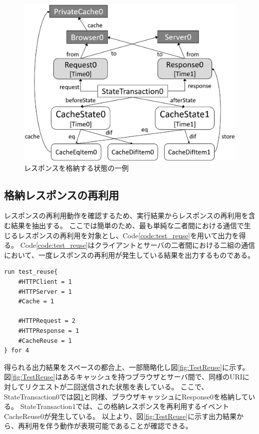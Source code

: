 \documentclass[12pt,a4paper]{jbook}
\begin{document}
\begin{figure}[htb]
\centering
\includegraphics[width=450pt]{./fig/TestStore.eps}
\caption{レスポンスを格納する状態の一例}
\label{fig:TestStore}
\end{figure}

\subsection{格納レスポンスの再利用}
レスポンスの再利用動作を確認するため、実行結果からレスポンスの再利用を含む結果を抽出する。
ここでは簡単のため、最も単純な二者間における通信で生じるレスポンスの再利用を対象とし、Code\ref{code:test_reuse}を用いて出力を得る。
Code\ref{code:test_reuse}はクライアントとサーバの二者間における二組の通信において、一度レスポンスの再利用が発生している結果を出力するものである。

\begin{lstlisting}[caption=格納レスポンスの再利用, label=code:test_reuse]
run test_reuse{
	#HTTPClient = 1
	#HTTPServer = 1
	#Cache = 1

	#HTTPRequest = 2
	#HTTPResponse = 1
	#CacheReuse = 1
} for 4
\end{lstlisting}

得られる出力結果をスペースの都合上、一部簡略化し図\ref{fig:TestReuse}に示す。
図\ref{fig:TestReuse}はあるキャッシュを持つブラウザとサーバ間で、同様のURIに対してリクエストが二回送信された状態を表している。
ここで、StateTransaction0では図\ref{fig:TestStore}と同様、ブラウザキャッシュにResponse0を格納している。
StateTransaction1では、この格納レスポンスを再利用するイベントCacheReuse0が発生している。
以上より、図\ref{fig:TestReuse}に示す出力結果から、再利用を伴う動作が表現可能であることが確認できる。
\end{document}
